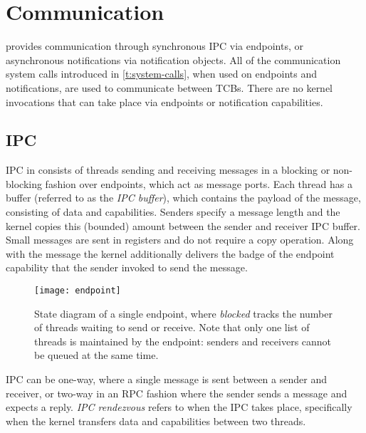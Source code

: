 \section{Communication}

\selfour provides communication through synchronous IPC via endpoints, or asynchronous notifications
via notification objects. All of the communication system calls introduced in \cref{t:system-calls},
when used on endpoints and notifications, are used to communicate between TCBs. There are no kernel
invocations that can take place via endpoints or notification capabilities. 

\subsection{IPC}
\label{p:sel4_ipc}

IPC in \selfour consists of threads sending and receiving messages in a blocking or non-blocking
fashion over endpoints, which act as
message ports. Each thread has a buffer (referred to as the \emph{IPC buffer}), which contains the payload of the message, consisting
of data and capabilities. Senders specify a message length and the kernel copies this (bounded)
amount between the sender and receiver IPC buffer. Small messages are sent in registers and do not
require a copy operation. 
Along with the message the kernel additionally delivers the badge of the endpoint capability that the sender 
invoked to send the message.

\begin{figure}[t]
    \centering
    \texttt{[image: endpoint]}
    \caption{State diagram of a single endpoint, where \emph{blocked} tracks the number of threads
    waiting to send or receive. Note that only one list of threads is maintained by the endpoint:
senders and receivers cannot be queued at the same time.}
    \label{f:endpoint}
\end{figure}


IPC can be one-way, where a single message is sent between a sender and receiver, or two-way in an
RPC fashion where the sender sends a message and expects a reply. \emph{IPC rendezvous} refers to
when the IPC takes place, specifically when the kernel transfers data and capabilities between two
threads. 

